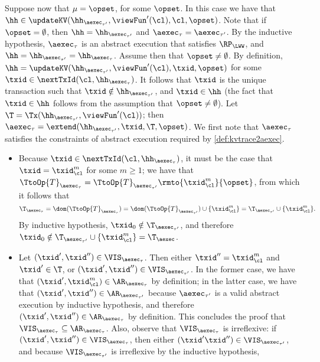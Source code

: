\begin{itemize}
Suppose now that $\mu = \opset$, for some $\opset$. In this case we have that  
$\hh \in \updateKV(\hh_{\aexec_{\tau'}}, \viewFun'(\cl), \cl, \opset)$. Note that if 
$\opset = \emptyset$, then $\hh = \hh_{\aexec_{\tau'}}$ and $\aexec_{\tau} = \aexec_{\tau'}$. 
By the inductive hypothesis, $\aexec_{\tau}$ is an abstract execution that satisfies 
$\RP_{\LWW}$, and $\hh = \hh_{\aexec_{\tau'}} = \hh_{\aexec_{\tau}}$. 
Assume then that $\opset \neq \emptyset$. By definition, $\hh = \updateKV(\hh_{\aexec_{\tau'}}, 
\viewFun'(\cl), \txid, \opset)$ for some $\txid \in \nextTxId(\cl, \hh_{\aexec_{\tau}})$. It follows that $\txid$ 
is the unique transaction such that $\txid \notin \hh_{\aexec_{\tau'}}$, and $\txid \in \hh$ 
(the fact that $\txid \in \hh$ follows from the assumption that $\opset \neq \emptyset$). Let 
$\T = \Tx(\hh_{\aexec_{\tau'}}, \viewFun'(\cl))$; then $\aexec_{\tau} = \extend(\hh_{\aexec_{\tau'}}, \txid, \T, \opset)$. 
We first note that $\aexec_{\tau}$ satisfies the constraints of abstract execution required by \cref{def:kvtrace2aexec}.
\begin{itemize}
\item  Because $\txid \in \nextTxId(\cl, \hh_{\aexec_{\tau}})$, it must be the case that $\txid = \txid_{\cl}^{m}$ for some 
$m \geq 1$; we have that $\TtoOp{T}_{\aexec_{\tau}} = \TtoOp{T}_{\aexec_{\tau'}}\rmto{\txid_{\cl}^{m}}{\opset}$, 
from which it follows that 
\[
\T_{\aexec_{\tau}} = \dom(\TtoOp{T}_{\aexec_{\tau}}) = \dom(\TtoOp{T}_{\aexec_{\tau'}}) \cup 
\{\txid_{\cl}^{m} \} = \T_{\aexec_{\tau'}} \cup \{\txid_{\cl}^{m} \}.
\]
By inductive hypothesis, $\txid_0 \notin \T_{\aexec_{\tau'}}$, and therefore $\txid_{0} \notin 
\T_{\aexec_{\tau'}} \cup \{\txid_{\cl}^{m} \} = \T_{\aexec}$.
\item Let $(\txid' ,\txid'') \in \VIS_{\aexec_{\tau}}$. Then either $\txid'' = \txid_{\cl}^{m}$ and $\txid' \in \T$, or $(\txid', \txid'') \in 
\VIS_{\aexec_{\tau'}}$. In the former case, we have that $(\txid', \txid_{\cl}^{m}) \in \AR_{\aexec_{\tau}}$ by definition; 
in the latter case, we have that $(\txid', \txid'') \in \AR_{\aexec_{\tau'}}$ because $\aexec_{\tau'}$ is a valid 
abstract execution by inductive hypothesis, and therefore $(\txid', \txid'') \in \AR_{\aexec_{\tau}}$ by definition. 
This concludes the proof that $\VIS_{\aexec_{\tau}} \subseteq \AR_{\aexec_{\tau}}$. 
Also, observe that $\VIS_{\aexec_{\tau}}$ is irreflexive: if $(\txid', \txid'') \in \VIS_{\aexec_{\tau}}$, then either 
$(\txid' \txid'') \in \VIS_{\aexec_{\tau'}}$, and because $\VIS_{\aexec_{\tau'}}$ is irreflexive by the inductive hypothesis, 

\end{itemize}
\end{itemize}
